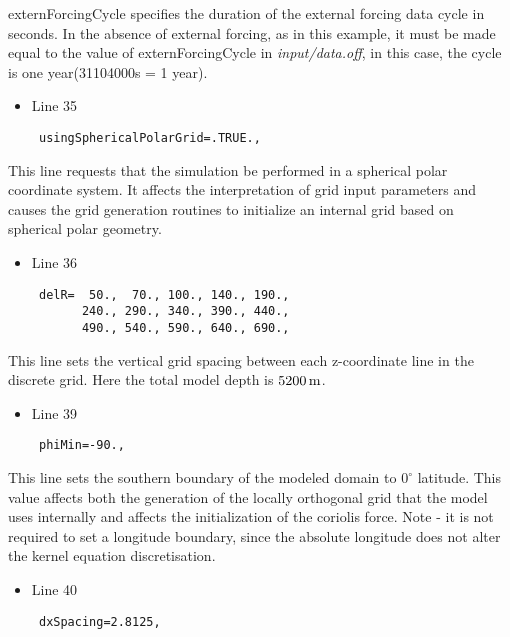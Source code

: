 \noindent externForcingCycle specifies the duration of the external
forcing data cycle in seconds. In the absence of external forcing, as
in this example, it must be made equal to the value of
externForcingCycle in {\it input/data.off}, in this case, the cycle is
one year(31104000s = 1 year).

\begin{itemize}
\item Line 35
\begin {verbatim}
 usingSphericalPolarGrid=.TRUE.,
\end{verbatim}
\end{itemize}

\noindent This line requests that the simulation be performed in a
spherical polar coordinate system. It affects the interpretation of
grid input parameters and causes the grid generation routines to
initialize an internal grid based on spherical polar geometry.

\begin{itemize}
\item Line 36
\begin {verbatim}
 delR=  50.,  70., 100., 140., 190., 
       240., 290., 340., 390., 440., 
       490., 540., 590., 640., 690.,
\end{verbatim}
\end{itemize}

\noindent This line sets the vertical grid spacing between each
z-coordinate line in the discrete grid. Here the total model depth is
$5200\,{\rm m}$.

\begin{itemize}
\item Line 39
\begin {verbatim}
 phiMin=-90.,
\end{verbatim}
\end{itemize}

\noindent This line sets the southern boundary of the modeled domain
to $0^{\circ}$ latitude. This value affects both the generation of the
locally orthogonal grid that the model uses internally and affects the
initialization of the coriolis force.  Note - it is not required to
set a longitude boundary, since the absolute longitude does not alter
the kernel equation discretisation.

\begin{itemize}
\item Line 40
\begin {verbatim}
 dxSpacing=2.8125,
\end{verbatim}
\end{itemize}


